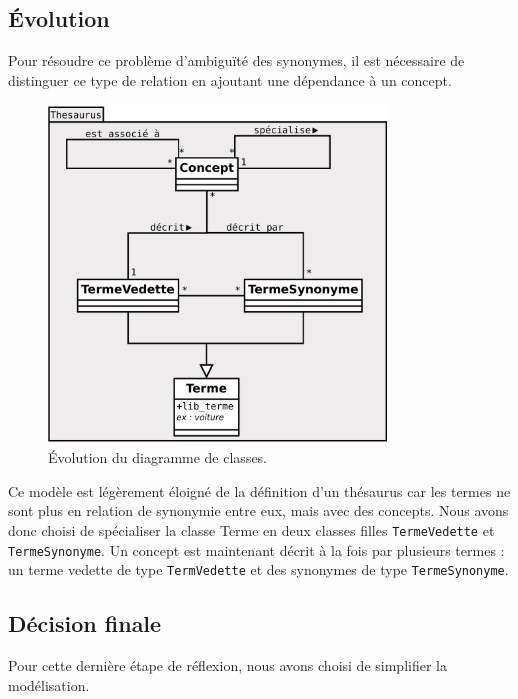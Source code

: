 \subsection{Évolution}
Pour résoudre ce problème d'ambiguïté des synonymes, il est nécessaire de distinguer ce type de relation en ajoutant une dépendance à un concept.

\begin{figure}[H]
\begin{center}
\includegraphics[width=0.8\textwidth]{files/class_v2}
\end{center}
\caption{Évolution du diagramme de classes.}
\end{figure}

Ce modèle est légèrement éloigné de la définition d'un thésaurus car les termes ne sont plus en relation de synonymie entre eux, mais avec des concepts. Nous avons donc choisi de spécialiser la classe Terme en deux classes filles \texttt{TermeVedette} et \texttt{TermeSynonyme}. Un concept est maintenant décrit à la fois par plusieurs termes : un terme vedette de type \texttt{TermVedette} et des synonymes de type \texttt{TermeSynonyme}.

\subsection{Décision finale}

Pour cette dernière étape de réflexion, nous avons choisi de simplifier la modélisation.

